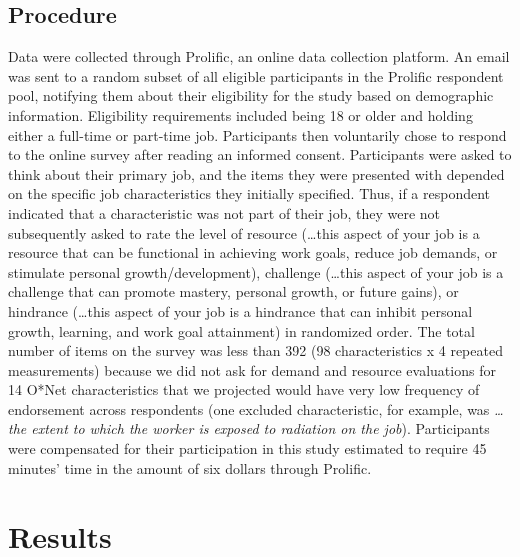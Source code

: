 \documentclass[
  man,mask]{apa7}
\begin{document}
\hypertarget{procedure}{%
\subsection{Procedure}\label{procedure}}

Data were collected through Prolific, an online data collection platform. An email was sent to a random subset of all eligible participants in the Prolific respondent pool, notifying them about their eligibility for the study based on demographic information. Eligibility requirements included being 18 or older and holding either a full-time or part-time job. Participants then voluntarily chose to respond to the online survey after reading an informed consent. Participants were asked to think about their primary job, and the items they were presented with depended on the specific job characteristics they initially specified. Thus, if a respondent indicated that a characteristic was not part of their job, they were not subsequently asked to rate the level of resource (\ldots this aspect of your job is a resource that can be functional in achieving work goals, reduce job demands, or stimulate personal growth/development), challenge (\ldots this aspect of your job is a challenge that can promote mastery, personal growth, or future gains), or hindrance (\ldots this aspect of your job is a hindrance that can inhibit personal growth, learning, and work goal attainment) in randomized order. The total number of items on the survey was less than 392 (98 characteristics x 4 repeated measurements) because we did not ask for demand and resource evaluations for 14 O*Net characteristics that we projected would have very low frequency of endorsement across respondents (one excluded characteristic, for example, was \emph{\ldots the extent to which the worker is exposed to radiation on the job}). Participants were compensated for their participation in this study estimated to require 45 minutes' time in the amount of six dollars through Prolific.

\hypertarget{results}{%
\section{Results}\label{results}}
\end{document}
